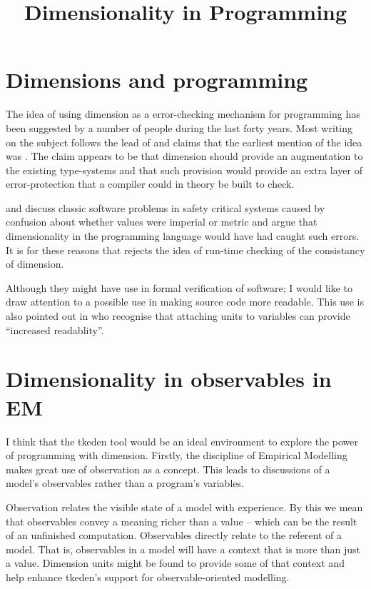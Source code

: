 \documentclass[a4paper]{article}
\title{Dimensionality in Programming}
\begin{document}
\section{Dimensions and programming}

The idea of using dimension as a error-checking mechanism for programming 
has been suggested by a number of people during the last forty years. 
Most writing on the subject follows the lead of \cite{ME_karrLoveman} and 
claims that the earliest mention of the idea was \cite{ME_cheatham}. 
The claim appears to be that dimension should provide an augmentation to the 
existing type-systems and that such provision would provide an extra layer of 
error-protection that a compiler could in theory be built to check.

\cite{grosu} and \cite{?} discuss classic software problems in safety critical
systems caused by confusion about whether values were imperial or metric
and argue that dimensionality in the programming language would have had caught
such errors. It is for these reasons that \cite{?} rejects the idea of run-time
checking of the consistancy of dimension.

Although they might have use in formal verification of software; I would like
to draw attention to a possible use in making source code more readable. This 
use is also pointed out in \cite{ME_karrLoveman} who recognise that attaching
units to variables can provide ``increased readablity''. 

\section{Dimensionality in observables in EM} 

I think that the tkeden tool would be an ideal environment
 to explore the power of programming with dimension. Firstly, the discipline 
of Empirical Modelling makes great use of observation as a concept. 
This leads to 
discussions of a model's observables rather than a program's variables. 

Observation relates the visible state of a model with experience. By this we
mean that observables convey a meaning richer than a value -- which can be
the result of an unfinished computation. 
Observables directly relate to the referent of a model. That is, observables 
in a model will have a context that is more than just a value. Dimension units 
might be found to provide some of that context and help enhance tkeden's 
support for observable-oriented modelling.





\end{document}
